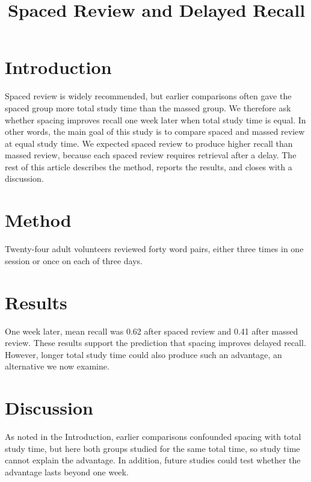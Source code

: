 \documentclass{article}
\title{Spaced Review and Delayed Recall}
\begin{document}
\maketitle

\section{Introduction}\label{sec:introduction}
Spaced review is widely recommended, but earlier comparisons often gave the spaced group more total study time than the massed group.
We therefore ask whether spacing improves recall one week later when total study time is equal.
In other words, the main goal of this study is to compare spaced and massed review at equal study time.
We expected spaced review to produce higher recall than massed review,
because each spaced review requires retrieval after a delay.
The rest of this article describes the method, reports the results, and closes with a discussion.

\section{Method}\label{sec:method}
Twenty-four adult volunteers reviewed forty word pairs, either three times in one session or once on each of three days.

\section{Results}\label{sec:results}
One week later, mean recall was 0.62 after spaced review and 0.41 after massed review.
These results support the prediction that spacing improves delayed recall.
However, longer total study time could also produce such an advantage, an alternative we now examine.

\section{Discussion}\label{sec:discussion}
As noted in the Introduction, earlier comparisons confounded spacing with total study time, but here both groups studied for the same total time, so study time cannot explain the advantage.
In addition, future studies could test whether the advantage lasts beyond one week.
\end{document}
